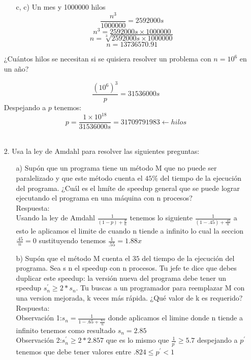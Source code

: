 \documentclass[12pt, letterpaper]{article}
\begin{document}
\begin{itemize}
\begin{itemize}
\item[c, c) ] Un mes y 1000000 hilos
$$\frac{n^3}{1000000} = 2592000s$$
$$n^3 = 2592000s \times 1000000$$
$$n = \sqrt[3]{2592000s \times 1000000}$$
$$n = 13736570.91$$
\end{itemize}
¿Cuántos hilos se necesitan si se quisiera resolver un problema con $n = 10^6$ en un año? 

$$\frac{(10^6)^3}{p} = 31536000s$$
Despejando a $p$ tenemos:
$$p = \frac{1\times 10^{18}}{31536000s} = 31709791983\leftarrow hilos$$
\\
\item[2. ] Usa la ley de Amdahl para resolver las siguientes preguntas:
\begin{itemize}


	\item[a)]Sup\'on que un programa tiene un m\'etodo M que no puede ser paralelizado y que este m\'etodo cuenta el $45\%$ del tiempo de la ejecuci\'on del programa. ¿Cu\'al es el lım\'ite de speedup general que se puede lograr ejecutando el programa en una máquina con n procesos? \\
	
	Respuesta:\\ Usando la ley de Amdahl $\frac{1}{(1-p)+\frac{p}{n}}$ tenemos lo siguiente $\frac{1}{(1-.45)+\frac{.45}{n}}$ a esto le aplicamos el limite de cuando n tiende a infinito lo cual la seccion $\frac{.45}{n} = 0$ sustituyendo tenemos $\frac{1}{.55} = 1.88x$ \\
	
	\item[b)]{Sup\'on que el m\'etodo M cuenta el $35$ del tiempo de la ejecuci\'on del programa. Sea s n el speedup con n procesos. Tu jefe te dice que debes duplicar este speedup: la versión nueva del programa debe tener un speedup $s_{n}^{'} \geq 2 * s_{n} $. Tu buscas a un programador para reemplazar M con una version mejorada, k veces m\'as r\'apida. ¿Qu\'e valor de k es requerido?}\\

	Respuesta:\\
	Observaci\'on 1:$s_{n} = \frac{1}{1-.65 +\frac{.65}{n}}$ donde aplicamos el limine donde n tiende a infinito tenemos como resultado $s_{n} = 2.85$ \\

	Observaci\'on 2:$s_{n}^{'} \geq 2*2.857$ que es lo mismo que $\frac{1}{p^{'}} \geq 5.7$ despejando a $p^{'}$ tenemos que debe tener valores entre $.824 \leq p^{'} < 1 $\\


\end{itemize}
\end{itemize}
\end{document}
